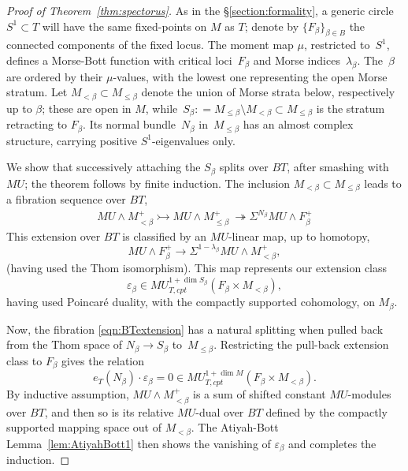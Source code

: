 \documentclass[11pt, reqno]{amsart}
\theoremstyle{plain}
\theoremstyle{definition}
\begin{document}
\begin{proof} [Proof of Theorem~\ref{thm:spectorus}]
As in the \S\ref{section:formality}, a generic circle $S^1\subset T$ will have the same fixed-points 
on $M$ as $T$; denote by 
$\{F_\beta\}_{\beta\in B}$ the connected components of the fixed locus. The moment map $\mu$, 
restricted to~$S^1$, defines a Morse-Bott function with critical loci~$F_\beta$ and Morse 
indices~$\lambda_\beta$. The~$\beta$ are  ordered by their $\mu$-values, with the lowest one 
representing the open Morse stratum. Let $M_{<\beta} \subset M_{\le \beta}$ denote the union 
of Morse strata below, respectively up to $\beta$; these are open in $M$, 
while~$S_\beta: = M_{\le \beta} \setminus M_{<\beta} \subset M_{\le \beta}$ is the stratum 
retracting to $F_\beta$. Its normal bundle~$N_\beta$ in~$M_{\le \beta}$ has an almost complex structure, 
carrying  positive $S^1$-eigenvalues only. 

We show that successively attaching the $S_\beta$ splits over $BT$, after smashing with~$MU$; 
the theorem follows by finite induction. The inclusion  $M_{<\beta} \subset M_{\le \beta}$ 
leads to a fibration sequence over $BT$, 
\begin{align}\label{eqn:BTextension}
MU\wedge M^+_{< \beta} \rightarrowtail MU\wedge M^+_{\le \beta} \:
\twoheadrightarrow \Sigma^{N_\beta} MU\wedge F^+_\beta
\end{align}
This extension over $BT$ is classified by an $MU$-linear map, up to homotopy,
\[
MU\wedge F^+_\beta \to \Sigma^{1-\lambda_\beta} MU\wedge M^+_{< \beta},
\]
(having used the Thom isomorphism). This map represents our extension class 
\[
\varepsilon_\beta\in MU^{1+\dim S_\beta}_{T,cpt}\left(F_\beta \times M_{< \beta}\right),
\] 
having used Poincar\'e duality, with the compactly supported cohomology, on $M_{\beta}$. 

Now, the fibration \eqref{eqn:BTextension} has a natural splitting when pulled back from the Thom space 
of $N_\beta\to S_\beta $ to~$M_{\le \beta}$. Restricting the pull-back extension class to $F_\beta$ 
gives the relation 
\[
e_T(N_\beta)\cdot \varepsilon_\beta = 0 \in MU^{1+\dim M}_{T, cpt}\left(F_{\beta} \times M_{< \beta}\right).
\]
By inductive assumption, $MU\wedge M^+_{< \beta}$ is a sum of shifted constant $MU$-modules over $BT$, and 
then so is its relative $MU$-dual over $BT$ defined by the compactly supported mapping space out of 
$M_{< \beta}$. The Atiyah-Bott Lemma~\ref{lem:AtiyahBott1}
then shows the vanishing of $\varepsilon_\beta$ and completes the induction.
\end{proof} 
\end{document}

